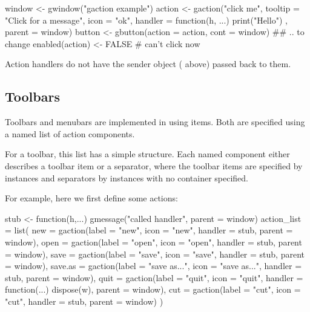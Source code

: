 \begin{Schunk}
\begin{Sinput}
 window <- gwindow("gaction example")
 action <- gaction("click me", tooltip = "Click for a message", 
                   icon = "ok", 
                   handler = function(h, ...) {
                     print("Hello")
                   },
                   parent = window)
 button <- gbutton(action = action, cont = window)
 ## .. to change
 enabled(action) <- FALSE                     # can't click now
\end{Sinput}
\end{Schunk}
Action handlers do not have the sender object ( above)
passed back to them.




\subsection{Toolbars}
\label{sec:gWidgets-toolbars}
Toolbars and menubars are implemented in  using
 items. Both are specified using a named
list of action components. 

For a toolbar, this list has a simple structure. Each named component
either describes a toolbar item or a separator, where the toolbar
items are specified by  instances and separators by
 instances with no container specified.

For example, here we first define some actions:
\begin{Schunk}
\begin{Sinput}
 stub <- function(h,...) gmessage("called handler", 
                                  parent = window)
 action_list = list(
   new = gaction(label = "new", icon = "new", 
     handler = stub, parent = window),
   open = gaction(label = "open", icon = "open", 
     handler = stub, parent = window),
   save = gaction(label = "save", icon = "save", 
     handler = stub, parent = window),
   save.as = gaction(label = "save as...", icon = "save as...", 
     handler = stub, parent = window),
   quit = gaction(label = "quit", icon = "quit", 
     handler = function(...) dispose(w), parent = window),
   cut = gaction(label = "cut", icon = "cut", 
     handler = stub, parent = window)
   )
 
\end{Sinput}
\end{Schunk}

